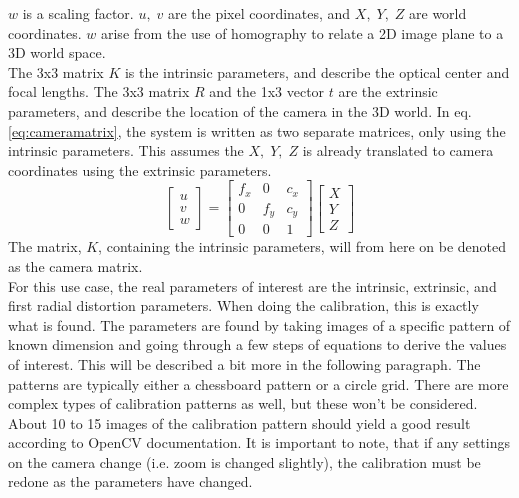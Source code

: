 $w$ is a scaling factor. $u,\; v$ are the pixel coordinates, and $X,\;Y,\;Z$ are world coordinates. $w$ arise from the use of homography to relate a 2D image plane to a 3D world space.\\

The 3x3 matrix $K$ is the intrinsic parameters, and describe the optical center and focal lengths. The 3x3 matrix $R$ and the 1x3 vector $t$ are the extrinsic parameters, and describe the location of the camera in the 3D world. 
In eq. \ref{eq:cameramatrix}, the system is written as two separate matrices, only using the intrinsic parameters. This assumes the $X, \; Y,\;Z $ is already translated to camera coordinates using the extrinsic parameters.
\begin{equation}
\left[\begin{array}{l}
u \\
v \\
w
\end{array}\right]=\left[\begin{array}{ccc}
f_{x} & 0 & c_{x} \\
0 & f_{y} & c_{y} \\
0 & 0 & 1
\end{array}\right]\left[\begin{array}{l}
X \\
Y \\
Z
\end{array}\right]
\label{eq:cameramatrix}
\end{equation}
The matrix, $K$, containing the intrinsic parameters, will from here on be denoted as the camera matrix. \\


For this use case, the real parameters of interest are the intrinsic, extrinsic, and first radial distortion parameters. When doing the calibration, this is exactly what is found. The parameters are found by taking images of a specific pattern of known dimension and going through a few steps of equations to derive the values of interest. This will be described a bit more in the following paragraph. The patterns are typically either a chessboard pattern or a circle grid. There are more complex types of calibration patterns as well, but these won't be considered.\\


 About 10 to 15 images of the calibration pattern should yield a good result according to OpenCV documentation. It is important to note, that if any settings on the camera change (i.e. zoom is changed slightly), the calibration must be redone as the parameters have changed.\\ 


